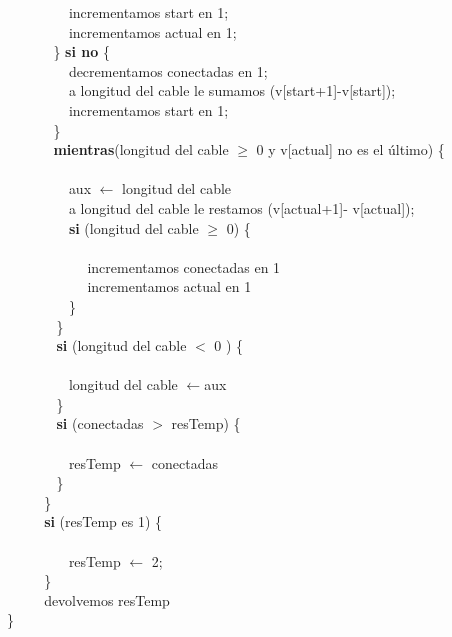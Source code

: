 $~~~~~~~~~~~~~~~~~~~~$incrementamos start en 1;  \\
$~~~~~~~~~~~~~~~~~~~~$incrementamos actual en 1;  \\
$~~~~~~~~~~~~~~~$\} \textbf{si no} \{ \\
$~~~~~~~~~~~~~~~~~~~~$decrementamos conectadas en 1;\\ 
$~~~~~~~~~~~~~~~~~~~~$a longitud del cable le sumamos (v[start+1]-v[start]);\\
$~~~~~~~~~~~~~~~~~~~~$incrementamos start en 1;  \\
$~~~~~~~~~~~~~~~$\} \\
$~~~~~~~~~~~~~~~$\textbf{mientras}(longitud del cable $\geq$ 0 y v[actual] no es el último) \{ \\  \\
$~~~~~~~~~~~~~~~~~~~~$aux $\leftarrow$ longitud del cable \\
$~~~~~~~~~~~~~~~~~~~~$a longitud del cable  le restamos (v[actual+1]- v[actual]); \\
$~~~~~~~~~~~~~~~~~~~~$\textbf{si} (longitud del cable $\geq$ 0) \{ \\ \\
$~~~~~~~~~~~~~~~~~~~~~~~~~~$incrementamos conectadas en 1  \\
$~~~~~~~~~~~~~~~~~~~~~~~~~~$incrementamos actual en 1  \\
$~~~~~~~~~~~~~~~~~~~~$\} \\
$~~~~~~~~~~~~~~~~$\} \\
$~~~~~~~~~~~~~~~~$\textbf{si} (longitud del cable $<$ 0 ) \{ \\ \\
$~~~~~~~~~~~~~~~~~~~~$longitud del cable $\leftarrow$aux\\
$~~~~~~~~~~~~~~~~$\} \\
$~~~~~~~~~~~~~~~~$\textbf{si} (conectadas $>$ resTemp) \{ \\ \\
$~~~~~~~~~~~~~~~~~~~~$resTemp $\leftarrow$ conectadas\\
$~~~~~~~~~~~~~~~~$\} \\
$~~~~~~~~~~~~$\} \\
$~~~~~~~~~~~~$\textbf{si} (resTemp es 1) \{ \\ \\
$~~~~~~~~~~~~~~~~~~~~$resTemp $\leftarrow$ 2;\\
$~~~~~~~~~~~~$\} \\
$~~~~~~~~~~~~$devolvemos resTemp  \\
\}\\

